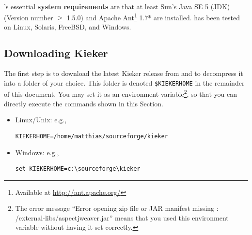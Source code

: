 \documentclass[a4paper,12pt]{scrartcl}
\begin{document}
\

\tpmon{}'s essential \textbf{system requirements} are that at least Sun's Java SE 5 (JDK) (Version number $\geq$ 1.5.0) and Apache Ant\footnote{Available at \url{http://ant.apache.org/}} 1.7* are installed. \tpmon{} has been tested on Linux, Solaris, FreeBSD, and Windows.

\subsection{Downloading Kieker}
The first step is to download the latest Kieker release from \kiekerurl{} and to decompress it into a folder of your choice. This folder is denoted \texttt{\$KIEKERHOME} in the remainder of this document. You may set it as an environment variable\footnote{The error message ``Error opening zip file or JAR manifest missing : /external-libs/aspectjweaver.jar'' means that you used this environment variable without having it set correctly.}, so that you can directly execute the commands shown in this Section.
\begin{itemize}
 \item Linux/Unix: e.g., %
\begin{lstlisting}[caption={}]
KIEKERHOME=/home/matthias/sourceforge/kieker
\end{lstlisting}
\item Windows: e.g.,
\begin{lstlisting}[caption={}]
set KIEKERHOME=c:\sourceforge\kieker
\end{lstlisting}
\end{itemize}
\end{document}

